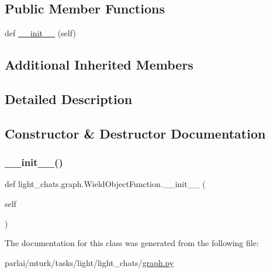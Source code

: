 \subsection*{Public Member Functions}
\begin{DoxyCompactItemize}
\item 
def \hyperlink{classlight__chats_1_1graph_1_1WieldObjectFunction_ae69815477d6c421c497848881eecf124}{\+\_\+\+\_\+init\+\_\+\+\_\+} (self)
\end{DoxyCompactItemize}
\subsection*{Additional Inherited Members}


\subsection{Detailed Description}
\begin{DoxyVerb}
\end{DoxyVerb}
 

\subsection{Constructor \& Destructor Documentation}
\mbox{\label{classlight__chats_1_1graph_1_1WieldObjectFunction_ae69815477d6c421c497848881eecf124}} 
\subsubsection{\texorpdfstring{\+\_\+\+\_\+init\+\_\+\+\_\+()}{\_\_init\_\_()}}
{\footnotesize\ttfamily def light\+\_\+chats.\+graph.\+Wield\+Object\+Function.\+\_\+\+\_\+init\+\_\+\+\_\+ (\begin{DoxyParamCaption}\item[{}]{self }\end{DoxyParamCaption})}



The documentation for this class was generated from the following file\+:\begin{DoxyCompactItemize}
\item 
parlai/mturk/tasks/light/light\+\_\+chats/\hyperlink{parlai_2mturk_2tasks_2light_2light__chats_2graph_8py}{graph.\+py}\end{DoxyCompactItemize}
